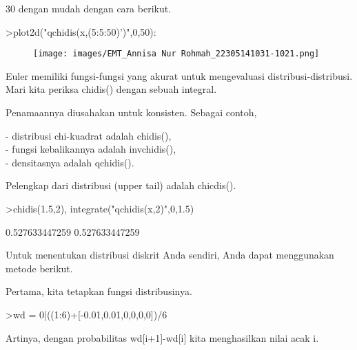 \documentclass[a4paper,10pt]{article}
\begin{document}
\begin{eulernotebook}
\begin{eulercomment}
\begin{eulercomment}
\begin{eulercomment}
\begin{eulercomment}
\begin{eulercomment}
30 dengan mudah dengan cara berikut.
\end{eulercomment}
\begin{eulerprompt}
>plot2d("qchidis(x,(5:5:50)')",0,50):
\end{eulerprompt}
\begin{figure}[h]
    \centering
    \texttt{[image: images/EMT\_Annisa Nur Rohmah\_22305141031-1021.png]}
\end{figure}
\begin{eulercomment}
Euler memiliki fungsi-fungsi yang akurat untuk mengevaluasi
distribusi-distribusi. Mari kita periksa chidis() dengan sebuah
integral.

Penamaannya diusahakan untuk konsisten. Sebagai contoh,

- distribusi chi-kuadrat adalah chidis(),\\
- fungsi kebalikannya adalah invchidis(),\\
- densitasnya adalah qchidis().

Pelengkap dari distribusi (upper tail) adalah chicdis().
\end{eulercomment}
\begin{eulerprompt}
>chidis(1.5,2), integrate("qchidis(x,2)",0,1.5)
\end{eulerprompt}
\begin{euleroutput}
  0.527633447259
  0.527633447259
\end{euleroutput}
\begin{eulercomment}
Untuk menentukan distribusi diskrit Anda sendiri, Anda dapat
menggunakan metode berikut.

Pertama, kita tetapkan fungsi distribusinya.
\end{eulercomment}
\begin{eulerprompt}
>wd = 0|((1:6)+[-0.01,0.01,0,0,0,0])/6
\end{eulerprompt}
\begin{euleroutput}
  [0,  0.165,  0.335,  0.5,  0.666667,  0.833333,  1]
\end{euleroutput}
\begin{eulercomment}
Artinya, dengan probabilitas wd[i+1]-wd[i] kita menghasilkan nilai
acak i.


\end{eulercomment}
\end{eulercomment}
\end{eulercomment}
\end{eulercomment}
\end{eulercomment}
\end{eulernotebook}
\end{document}
